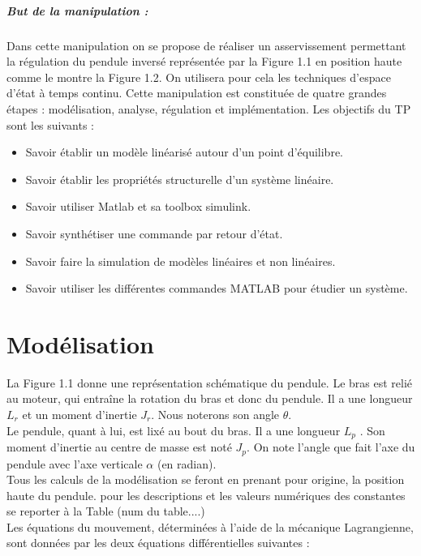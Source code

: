 \documentclass[12pt, a4paper, openany]{report}
\begin{document}
\paragraph{But de la manipulation :}  Dans cette manipulation on se propose de réaliser un asservissement permettant la régulation du pendule inversé représentée par la Figure 1.1 en position haute comme le montre la Figure 1.2. On utilisera pour cela les techniques d'espace d'état à temps continu. Cette manipulation est constituée de quatre grandes étapes : modélisation, analyse, régulation et implémentation. Les objectifs du TP sont les suivants :
\begin{itemize}
\item Savoir établir un modèle linéarisé autour d'un point d'équilibre.
\item Savoir établir les propriétés structurelle d'un système linéaire.
\item Savoir utiliser Matlab et sa toolbox simulink.
\item Savoir synthétiser une commande par retour d'état.
\item Savoir faire la simulation de modèles linéaires et non linéaires.
\item Savoir utiliser les différentes commandes MATLAB pour étudier un système.

\end{itemize}

    
 \chapter{Modélisation}
 
 La Figure 1.1 donne une représentation schématique du pendule. Le bras est relié au moteur, qui entraîne la rotation du bras et donc du pendule. Il a une longueur $L_{r}$ et un moment d'inertie $J_{r}$. Nous noterons son angle $\theta$.\\
 Le pendule, quant à lui, est lixé au bout du bras. Il a une longueur $L_{p}$ . Son moment d'inertie au
centre de masse est noté $J_{p}$. On note l'angle que fait l'axe du pendule avec l'axe verticale $\alpha$ (en radian).\\
 Tous les calculs de la modélisation se feront en prenant pour origine, la position haute du pendule. pour les descriptions et les valeurs numériques des constantes se reporter à la Table (num du table....) \\
 Les équations du mouvement, déterminées à l'aide de la mécanique Lagrangienne, sont données par les
deux équations différentielles suivantes : \\[0.5cm]\\
\end{document}
